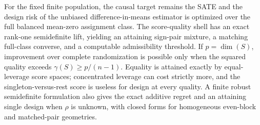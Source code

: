 For the fixed finite population, the causal target remains the SATE and the design risk of the unbiased difference-in-means estimator is optimized over the full balanced mean-zero assignment class. The score-quality shell has an exact rank-one semidefinite lift, yielding an attaining sign-pair mixture, a matching full-class converse, and a computable admissibility threshold. If \(p=\dim(S)\), improvement over complete randomization is possible only when the squared quality exceeds \(\gamma(S)\geq p/(n-1)\). Equality is attained exactly by equal-leverage score spaces; concentrated leverage can cost strictly more, and the singleton-versus-rest score is useless for design at every quality. A finite robust semidefinite formulation also gives the exact additive regret and an attaining single design when \(\rho\) is unknown, with closed forms for homogeneous even-block and matched-pair geometries.